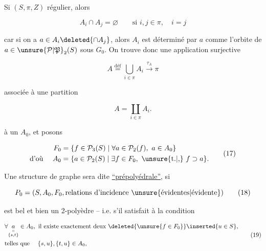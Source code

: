 Si  \deleted{\unsure{$($}} $(S,\pi,Z)$  régulier, alors 

\[ A_i\cap A_j=\varnothing\qquad\text{si }i,j\in\pi,\quad i=j \tag*{(14)} \]

car si on a $a\in A_i\deleted{\cap A_j}$, alors $A_i$ est déterminé par $a$ comme l'orbite de $a\in\unsure{\mathcal P|\mathfrak P}_2(S)$ sous $G_0$. On trouve donc une application surjective


\[ A\overset{\mathrm{déf}}{=}\bigcup_{i\in\pi} A_i\xrightarrow{\tau_A}\pi \tag*{(15)} \]

associée à une partition

\[ A=\coprod_{i\in\pi} A_i. \tag*{(16)} \]

  à un $A_0$, et posons

\[
\begin{aligned}
 F_0&=\{f\in\mathcal P_3(S)\mid\forall a\in\mathcal P_2(f),\ a\in A_0\}\\
 \text{d'où }\quad A_0&=\{a\in\mathcal P_2(S)\mid\exists f\in F_0,\ \text{\unsure{t.|,}}~ f\supset a\}.
\end{aligned}\tag*{(17)}
\]

Une structure de graphe sera dite   \uline{``prépolyédrale''}, si

\[ P_0=(S,A_0,F_0,\text{relations d'incidence \unsure{évidentes|évidente}}) \tag*{(18)} \]


est bel et bien un 2-polyèdre -- i.e. s'il satisfait à la condition 

\[
\begin{aligned}
 &\forall \underset{\substack{\shortparallel\\\{s,t\}}}{a}\in A_0,\ \text{il existe exactement deux }\deleted{\unsure{f\in F_0}}\inserted{u\in S},\\
 &\text{telles que }\quad\{s,u\},\{t,u\}\in A_0,
\end{aligned}\tag*{(19)}
\]

